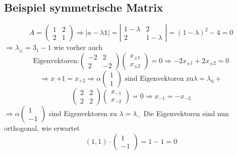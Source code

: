 \documentclass[11pt]{article}
\begin{document}
\subsection{Beispiel symmetrische Matrix}
\[ A = \left( \begin{matrix}
1 & 2 \\ 2 & 1  
\end{matrix} \right) \Rightarrow |a - \lambda \mathds{1} | = \left| \begin{matrix}
1- \lambda & 2 \\ 2 & 1-\lambda
\end{matrix} \right| = (1 - \lambda)^2 -4  = 0 \]
$ \Rightarrow \lambda_\pm = 3_1 - 1  $ wie vorher auch
\[ \text{Eigenvektoren:} \left( \begin{matrix}
-2 & 2 \\ 2 & -2 
\end{matrix} \right) \left( \begin{matrix}
x_{\pm 1} \\ x_{\pm 2}
\end{matrix} \right) = 0 \Rightarrow -2x_{\pm 1} + 2x_{\pm 2} = 0 \]
\[ \Rightarrow x_.{+1 } = x_{+2} \Rightarrow \alpha \left( \begin{matrix}
1 \\ 1 
\end{matrix} \right) \text{ sind Eigenvektoren zu} \lambda = \lambda_ü+ \]
\[ \left(\begin{matrix}
2 & 2 \\ 2 & 2
\end{matrix}\right) \left( \begin{matrix}
x_{-1} \\ x_{-2}
\end{matrix} \right) = 0 \Rightarrow x_{-1} = -x_{-2}  \]
$ \Rightarrow \alpha\left(\begin{matrix}
1 \\ -1
\end{matrix}\right)$ sind Eigenvektoren zu $\lambda = \lambda_-$
Die Eigenvektoren sind nun orthogonal, wie erwartet
\[ (1,1) \cdot \left( \begin{matrix}
1 \\ -1
\end{matrix} \right) = 1 - 1 = 0 \]
\end{document}
